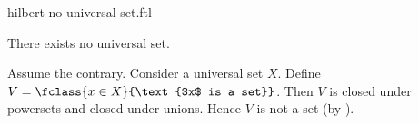 \documentclass{stex}
\begin{document}
\begin{smodule}{hilbert-no-universal-set.ftl}

  \begin{fproposition*}[label=hilbert_paradox_corollary]
    There exists no universal set.
  \end{fproposition*}
  \begin{fproof}[method=contradiction]
    Assume the contrary.
    Consider a universal set $X$.
    Define $V = \fclass{x \in X}{\text{$x$ is a set}}$.
    Then $V$ is closed under powersets and closed under unions.
    Hence $V$ is not a set (by ).
  \end{fproof}
\end{smodule}
\end{document}
